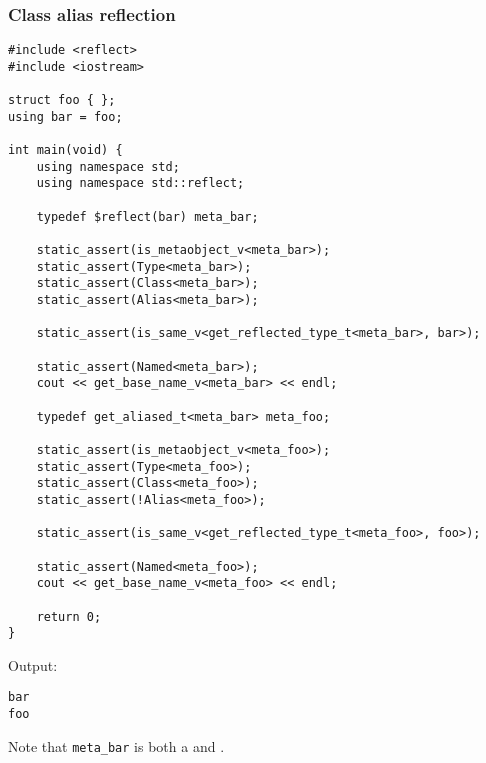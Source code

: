\subsubsection{Class alias reflection}

\begin{verbatim}
#include <reflect>
#include <iostream>

struct foo { };
using bar = foo;

int main(void) {
	using namespace std;
	using namespace std::reflect;

	typedef $reflect(bar) meta_bar;

	static_assert(is_metaobject_v<meta_bar>);
	static_assert(Type<meta_bar>);
	static_assert(Class<meta_bar>);
	static_assert(Alias<meta_bar>);

	static_assert(is_same_v<get_reflected_type_t<meta_bar>, bar>);

	static_assert(Named<meta_bar>);
	cout << get_base_name_v<meta_bar> << endl;

	typedef get_aliased_t<meta_bar> meta_foo;

	static_assert(is_metaobject_v<meta_foo>);
	static_assert(Type<meta_foo>);
	static_assert(Class<meta_foo>);
	static_assert(!Alias<meta_foo>);

	static_assert(is_same_v<get_reflected_type_t<meta_foo>, foo>);

	static_assert(Named<meta_foo>);
	cout << get_base_name_v<meta_foo> << endl;

	return 0;
}
\end{verbatim}

Output:

\begin{verbatim}
bar
foo
\end{verbatim}

Note that \texttt{meta\_bar} is both a  and .

